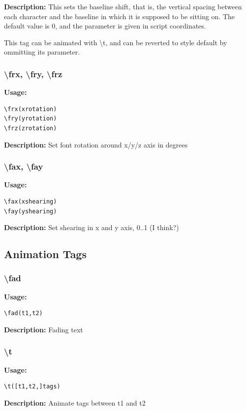 \documentclass{spec}
\begin{document}
\textbf{Description:}
This sets the baseline shift, that is, the vertical spacing between each character and the baseline
in which it is supposed to be sitting on. The default value is 0, and the parameter is given in
script coordinates.

This tag can be animated with \textbackslash t, and can be reverted to style default by ommitting
its parameter.

\subsubsection{\textbackslash frx, \textbackslash fry, \textbackslash frz}
\textbf{Usage:}
\begin{verbatim}
\frx(xrotation)
\fry(yrotation)
\frz(zrotation)
\end{verbatim}

\textbf{Description:}
Set font rotation around x/y/z axis in degrees

\subsubsection{\textbackslash fax, \textbackslash fay}
\textbf{Usage:}
\begin{verbatim}
\fax(xshearing)
\fay(yshearing)
\end{verbatim}

\textbf{Description:}
Set shearing in x and y axis, 0..1 (I think?)

\subsection{Animation Tags}

\subsubsection{\textbackslash fad}
\textbf{Usage:}
\begin{verbatim}
\fad(t1,t2)
\end{verbatim}

\textbf{Description:}
Fading text

\subsubsection{\textbackslash t}
\textbf{Usage:}
\begin{verbatim}
\t([t1,t2,]tags)
\end{verbatim}

\textbf{Description:}
Animate tags between t1 and t2
\end{document}
